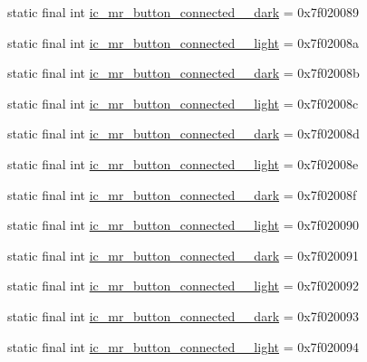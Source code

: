 \begin{CompactItemize}
\item 
static final int \hyperlink{classandroid_1_1support_1_1v7_1_1appcompat_1_1_r_1_1drawable_e2723fb2bc68f930ecff037325c59599}{ic\_\-mr\_\-button\_\-connected\_\_\-dark} = 0x7f020089
\item 
static final int \hyperlink{classandroid_1_1support_1_1v7_1_1appcompat_1_1_r_1_1drawable_73a2b0d27e3fb46f8c11a3b70d28d3d5}{ic\_\-mr\_\-button\_\-connected\_\_\-light} = 0x7f02008a
\item 
static final int \hyperlink{classandroid_1_1support_1_1v7_1_1appcompat_1_1_r_1_1drawable_d5ed8bb96a1e77e4567cdaf2f3f252e5}{ic\_\-mr\_\-button\_\-connected\_\_\-dark} = 0x7f02008b
\item 
static final int \hyperlink{classandroid_1_1support_1_1v7_1_1appcompat_1_1_r_1_1drawable_b063077c10327c9bafb9ccfd3a1bf30c}{ic\_\-mr\_\-button\_\-connected\_\_\-light} = 0x7f02008c
\item 
static final int \hyperlink{classandroid_1_1support_1_1v7_1_1appcompat_1_1_r_1_1drawable_a134549fcf5f2561157570cda5c74d42}{ic\_\-mr\_\-button\_\-connected\_\_\-dark} = 0x7f02008d
\item 
static final int \hyperlink{classandroid_1_1support_1_1v7_1_1appcompat_1_1_r_1_1drawable_80a0ef27cf8fa75a9044bea11b5c55f6}{ic\_\-mr\_\-button\_\-connected\_\_\-light} = 0x7f02008e
\item 
static final int \hyperlink{classandroid_1_1support_1_1v7_1_1appcompat_1_1_r_1_1drawable_b10a1c8f704e80560874f6db891776af}{ic\_\-mr\_\-button\_\-connected\_\_\-dark} = 0x7f02008f
\item 
static final int \hyperlink{classandroid_1_1support_1_1v7_1_1appcompat_1_1_r_1_1drawable_f10004dbdcc3063505a70175d4dfcba8}{ic\_\-mr\_\-button\_\-connected\_\_\-light} = 0x7f020090
\item 
static final int \hyperlink{classandroid_1_1support_1_1v7_1_1appcompat_1_1_r_1_1drawable_55c63a1d513a73220394e20ba87352b6}{ic\_\-mr\_\-button\_\-connected\_\_\-dark} = 0x7f020091
\item 
static final int \hyperlink{classandroid_1_1support_1_1v7_1_1appcompat_1_1_r_1_1drawable_3928b17054cb0ecb101c3966dea9febb}{ic\_\-mr\_\-button\_\-connected\_\_\-light} = 0x7f020092
\item 
static final int \hyperlink{classandroid_1_1support_1_1v7_1_1appcompat_1_1_r_1_1drawable_4f7e432c450dc932b99f49e4008bbecb}{ic\_\-mr\_\-button\_\-connected\_\_\-dark} = 0x7f020093
\item 
static final int \hyperlink{classandroid_1_1support_1_1v7_1_1appcompat_1_1_r_1_1drawable_ae7f6c426dccac32abddfe82eab5fe1a}{ic\_\-mr\_\-button\_\-connected\_\_\-light} = 0x7f020094

\end{CompactItemize}
